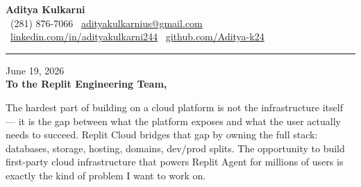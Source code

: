 \documentclass[11pt,letterpaper]{article}
\begin{document}
\begin{center}
    {\Huge \textbf{\color{ReplitOrange} Aditya Kulkarni}}\\[8pt]
    {\color{DarkGrey} \small
    \faPhone \ (281) 876-7066 \quad \textbar \quad
    \faEnvelope \ \href{mailto:adityakulkarnius@gmail.com}{adityakulkarnius@gmail.com} \\[4pt]
    \faLinkedin \ \href{https://linkedin.com/in/adityakulkarni244}{linkedin.com/in/adityakulkarni244} \quad \textbar \quad
    \faGithub \ \href{https://github.com/Aditya-k24}{github.com/Aditya-k24}
    }
\end{center}

\vspace{-4pt}
{\color{ReplitOrange}\rule{\linewidth}{1.5pt}}
\vspace{10pt}

June 19, 2026\\[10pt]
\textbf{To the Replit Engineering Team,}

\vspace{6pt}

The hardest part of building on a cloud platform is not the infrastructure itself --- it is the gap between what the platform exposes and what the user actually needs to succeed. Replit Cloud bridges that gap by owning the full stack: databases, storage, hosting, domains, dev/prod splits. The opportunity to build first-party cloud infrastructure that powers Replit Agent for millions of users is exactly the kind of problem I want to work on.

\vspace{4pt}
\end{document}
